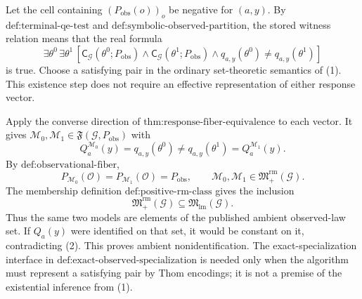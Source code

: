 Let the cell containing \((P_{\mathrm{obs}}(o))_o\) be negative for \((a,y)\). By \(\text{def:terminal-qe-test}\) and \(\text{def:symbolic-observed-partition}\), the stored witness relation means that the real formula
\[
\exists\theta^0\,\exists\theta^1\,
\left[
\mathsf C_{\mathcal G}(\theta^0;P_{\mathrm{obs}})
\wedge\mathsf C_{\mathcal G}(\theta^1;P_{\mathrm{obs}})
\wedge q_{a,y}(\theta^0)\neq q_{a,y}(\theta^1)
\right]
\tag{1}
\]
is true. Choose a satisfying pair in the ordinary set-theoretic semantics of (1). This existence step does not require an effective representation of either response vector.

Apply the converse direction of \(\text{thm:response-fiber-equivalence}\) to each vector. It gives \(\mathcal M_0,\mathcal M_1\in\mathfrak F(\mathcal G,P_{\mathrm{obs}})\) with
\[
Q_a^{\mathcal M_0}(y)=q_{a,y}(\theta^0)
\neq q_{a,y}(\theta^1)=Q_a^{\mathcal M_1}(y).
\tag{2}
\]
By \(\text{def:observational-fiber}\),
\[
P_{\mathcal M_0}(\mathcal O)
=P_{\mathcal M_1}(\mathcal O)
=P_{\mathrm{obs}},
\qquad
\mathcal M_0,\mathcal M_1\in\mathfrak M_{+}^{\mathrm{rm}}(\mathcal G).
\tag{3}
\]
The membership definition \(\text{def:positive-rm-class}\) gives the inclusion
\[
\mathfrak M_{+}^{\mathrm{rm}}(\mathcal G)
\subseteq\mathfrak M_{\mathrm{lm}}(\mathcal G).
\tag{4}
\]
Thus the same two models are elements of the published ambient observed-law set. If \(Q_a(y)\) were identified on that set, it would be constant on it, contradicting (2). This proves ambient nonidentification. The exact-specialization interface in \(\text{def:exact-observed-specialization}\) is needed only when the algorithm must represent a satisfying pair by Thom encodings; it is not a premise of the existential inference from (1).